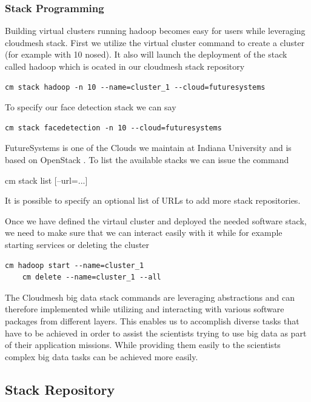\subsubsection{Stack Programming} \label{S:stack-programming}

Building virtual clusters running hadoop becomes easy for users while
leveraging cloudmesh stack. First we utilize the virtual cluster
command to create a cluster (for example with 10 nosed). It also will 
launch the deployment of the stack called hadoop which is ocated in
our cloudmesh stack repository

\begin{Verbatim}
cm stack hadoop -n 10 --name=cluster_1 --cloud=futuresystems
\end{Verbatim}
\vspace{-12pt}

To specify our face detection stack 
we  can say 

\begin{Verbatim}
cm stack facedetection -n 10 --cloud=futuresystems
\end{Verbatim}

FutureSystems is one of the Clouds we maintain at Indiana University
and is based on OpenStack \cite{??}. To list the available stacks we
can issue the command

cm stack list [--url=...]

It is possible to specify an optional list of URLs to add more stack
repositories.

Once we have defined the virtaul cluster and deployed the needed
software stack, we need to make sure that we can interact easily with
it while for example starting services or deleting the cluster

\begin{Verbatim}[fontfamily=helvetica]
    cm hadoop start --name=cluster_1
    cm delete --name=cluster_1 --all  
\end{Verbatim}
\vspace{-12pt}

The Cloudmesh big data stack commands are leveraging abstractions and
can therefore implemented while utilizing and interacting with various
software packages from different layers. This enables us to accomplish
diverse tasks that have to be achieved in order to assist the
scientists trying to use big data as part of their application
missions. While providing them easily to the scientists complex big
data tasks can be achieved more easily.


\subsection{Stack Repository}

